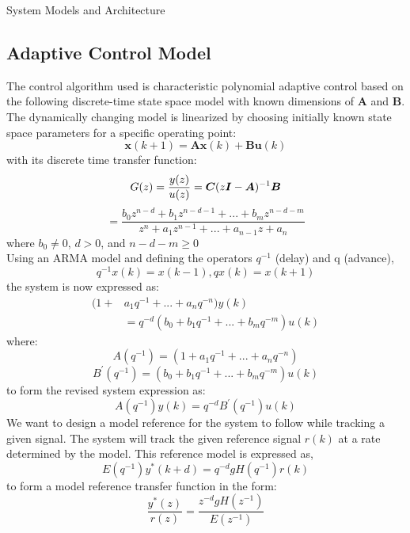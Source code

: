 \begin{section}{System Models and Architecture}
\subsection{Adaptive Control Model}
The control algorithm used is characteristic polynomial adaptive control based on the following discrete-time state space model with known dimensions of $\bm{A}$ and $\bm{B}$. The dynamically changing model is linearized by choosing initially known state space parameters for a specific operating point:
	\begin{equation}
	\bm{x}(k+1) = \bm{A}\bm{x}(k) + \bm{B}\bm{u}(k)
	\end{equation}
with its discrete time transfer function:
	\begin{equation}
        G(z) = \frac{y(z)}{u(z)} = \bm{C}(z\bm{I}-\bm{A})^{-1}\bm{B} \nonumber \\
    \end{equation}
    \begin{equation}
	= \frac{b_0z^{n-d}+b_1z^{n-d-1} +...+b_mz^{n-d-m}}{z^{n}+a_1z^{n-1}+...+a_{n-1}z+a_n}
	\end{equation}
where $b_0\ne{0}$, $d>0$, and $n-d-m\geq{0}$\\
Using an ARMA model and defining the operators $q^{-1}$ (delay) and q (advance),
	\begin{equation}
	q^{-1}x(k) = x(k-1), qx(k) = x(k+1)
	\end{equation}
the system is now expressed as:
    \begin{align}
	(1+&a_1q^{-1}+...+a_nq^{-n})y(k) \nonumber \\
	&=q^{-d}(b_0+b_1q^{-1}+...+b_mq^{-m})u(k)
	\end{align}
where:
	\begin{equation}
	A(q^{-1})=(1+a_1q^{-1}+...+a_nq^{-n}) \nonumber
	\end{equation}
	\begin{equation}
	B^{'}(q^{-1})=(b_0+b_1q^{-1}+...+b_mq^{-m})u(k) \nonumber
	\end{equation}
to form the revised system expression as:
	\begin{equation}
	A(q^{-1})y(k)=q^{-d}B^{'}(q^{-1})u(k)
	\end{equation}
We want to design a model reference for the system to follow while tracking a given signal. The system will track the given reference signal $r(k)$ at a rate determined by the model. This reference model is expressed as,
	\begin{equation}
	E(q^{-1})y^*(k+d)=q^{-d}gH(q^{-1})r(k)
	\end{equation}
to form a model reference transfer function in the form:
	\begin{equation}
	\frac{y^*(z)}{r(z)}=\frac{z^{-d}gH(z^{-1})}{E(z^{-1})}
	\end{equation}

\end{section}